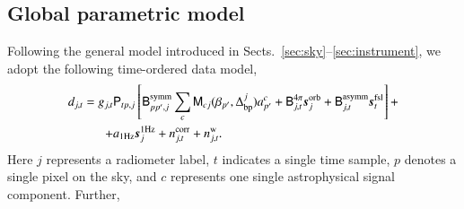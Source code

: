 \documentclass[twocolumn]{aa}
\newcommand{\s}[0]{\vec{s}}
\newcommand{\B}[0]{\tens{B}}
\newcommand{\M}[0]{\tens{M}}
\renewcommand{\P}[0]{\tens{P}}
\newcommand{\Dbp}[0]{\Delta_{\mathrm{bp}}}
\begin{document}
\subsection{Global parametric model}
\label{sec:unimodel}

Following the general model introduced in
Sects.~\ref{sec:sky}--\ref{sec:instrument}, we adopt the following
time-ordered data model,
\begin{equation}
  \begin{split}
    d_{j,t} = g_{j,t}&\P_{tp,j}\left[\B^{\mathrm{symm}}_{pp',j}\sum_{c}
      \M_{cj}(\beta_{p'}, \Dbp^{j})a^c_{p'}  + \B^{4\pi}_{j,t}\s^{\mathrm{orb}}_{j}  
      + \B^{\mathrm{asymm}}_{j,t} \s^{\mathrm{fsl}}_{t} \right]
    +   \label{eq:todmodel} \\
    + &a_{\mathrm{1Hz}}\s^{\mathrm{1Hz}}_{j} + n^{\mathrm{corr}}_{j,t} + n^{\mathrm{w}}_{j,t}.
  \end{split}
\end{equation}
Here $j$ represents a radiometer label, $t$ indicates a single
time sample, $p$ denotes a single pixel on the sky, and $c$ represents
one single astrophysical signal component. Further,
\end{document}

